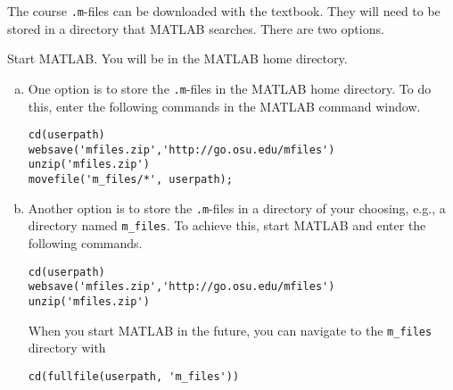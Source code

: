 \documentclass{article}
\begin{document}
The course \texttt{.m}-files can be downloaded with the textbook.
They will need to be stored in a directory that MATLAB searches.
There are two options.

Start MATLAB.  You will be in the MATLAB home directory.

\begin{enumerate}[(a)]
\item One option is to store the \texttt{.m}-files in the MATLAB home
  directory.  To do this, enter the following commands in the MATLAB
  command window.
  
\begin{verbatim}
cd(userpath)
websave('mfiles.zip','http://go.osu.edu/mfiles')
unzip('mfiles.zip')
movefile('m_files/*', userpath);
\end{verbatim}
  
\item Another option is to store the \texttt{.m}-files in a directory of your choosing, e.g., a directory named \verb|m_files|.  To achieve this, start MATLAB and enter the following commands.
\begin{verbatim}
cd(userpath)
websave('mfiles.zip','http://go.osu.edu/mfiles')
unzip('mfiles.zip')
\end{verbatim}
When you start MATLAB in the future, you can navigate to the \verb|m_files| directory with 
\begin{verbatim}
cd(fullfile(userpath, 'm_files'))
\end{verbatim}

\end{enumerate}
\end{document}
